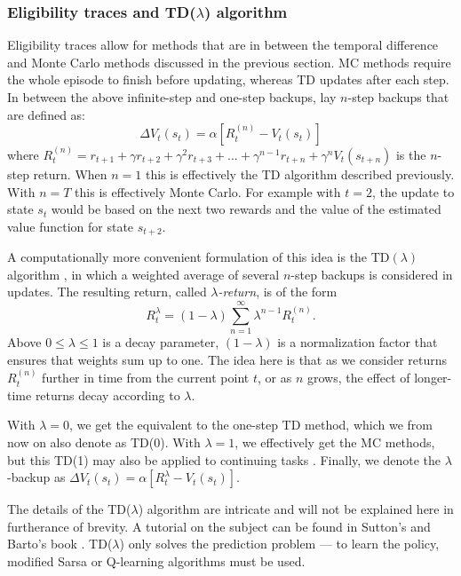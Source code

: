 \documentclass{article} %
\begin{document}
\subsubsection{Eligibility traces and TD($\lambda$) algorithm}

Eligibility traces \cite{watkins1989learning} allow for methods that are in
between the temporal difference and Monte Carlo methods discussed in the
previous section. MC methods require the whole episode to finish before
updating, whereas TD updates after each step. In between the above
infinite-step and one-step backups, lay $n$-step backups that are defined as:
\begin{equation}
  \Delta V_t(s_t) = \alpha[R^{(n)}_t - V_t(s_t)]
\end{equation}
where $R^{(n)}_t = r_{t+1} + \gamma r_{t+2} + \gamma^2 r_{t+3} + ... +
\gamma^{n-1} r_{t+n} + \gamma^n V_t(s_{t+n})$ is the $n$-step return. When $n =
1$ this is effectively the TD algorithm described previously. With $n = T$ this
is effectively Monte Carlo. For example with $t=2$, the update to state $s_t$
would be based on the next two rewards and the value of the estimated value
function for state $s_{t+2}$.

A computationally more convenient formulation of this idea is the TD$(\lambda)$
algorithm \cite{sutton1988learning}, in which a weighted average of several
$n$-step backups is considered in updates. The resulting return, called
\emph{$\lambda$-return}, is of the form
\begin{equation}
  R^{\lambda}_t = (1 - \lambda) \sum_{n=1}^{\infty} \lambda^{n-1} R^{(n)}_t.
\end{equation}
Above $0 \leq \lambda \leq 1$ is a decay parameter, $(1-\lambda)$ is a
normalization factor that ensures that weights sum up to one. The idea here is
that as we consider returns $R^{(n)}_t$ further in time from the current point
$t$, or as $n$ grows, the effect of longer-time returns decay according to
$\lambda$.

With $\lambda = 0$, we get the equivalent to the one-step TD method, which we
from now on also denote as TD(0). With $\lambda = 1$, we effectively get the MC
methods, but this TD(1) may also be applied to continuing tasks \cite{book}.
Finally, we denote the $\lambda$-backup as $\Delta V_t(s_t) =
\alpha[R^{\lambda}_t - V_t(s_t)]$.

The details of the TD($\lambda$) algorithm are intricate and will not be
explained here in furtherance of brevity. A tutorial on the subject can be
found in Sutton's and Barto's book \cite{book}. TD($\lambda$) only solves the
prediction problem --- to learn the policy, modified Sarsa or Q-learning
algorithms must be used.
\end{document}
